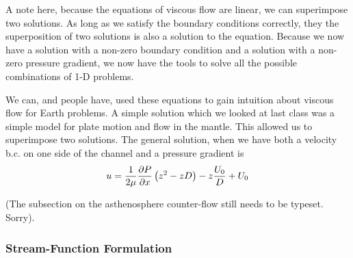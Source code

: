 \documentclass[12pt,twoside]{article}
\begin{document}
A note here, because the equations of viscous flow are linear, we can
superimpose two solutions.  As long as we satisfy the boundary conditions
correctly, they the superposition of two solutions is also a solution to the
equation.   Because we now have a solution with a non-zero boundary condition
and a solution with a non-zero pressure gradient, we now have the tools to
solve all the possible combinations of 1-D problems. 

We can, and people have, used these equations to gain intuition about viscous
flow for Earth problems.   A simple solution which we looked at last class was
a simple model for plate motion and flow in the mantle.   This allowed us to
superimpose two solutions.   The general solution, when we have both a velocity
b.c. on one side of the channel and a pressure gradient is
\begin{equation}  
u = {1\over{2\mu}} {{\partial P}\over {\partial x}} 
\left ( z^2 - zD \right ) - z{U_0 \over D} + U_0
\end{equation}

(The subsection on the asthenosphere counter-flow still needs to be typeset. 
Sorry).


\subsubsection{Stream-Function Formulation}
\end{document}
